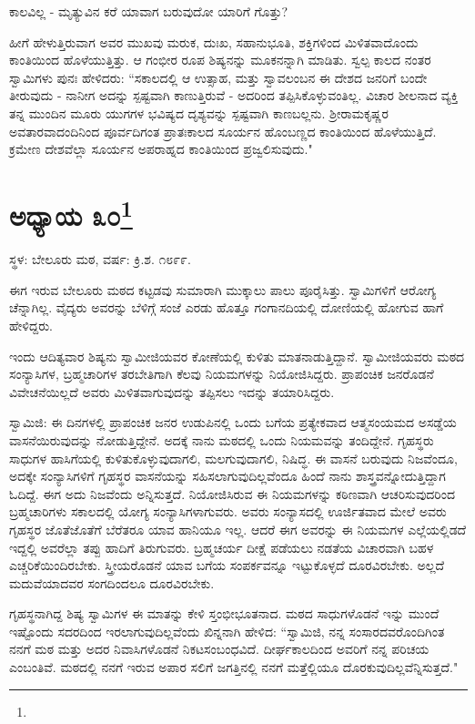 ಕಾಲವಿಲ್ಲ - ಮೃತ್ಯುವಿನ ಕರೆ ಯಾವಾಗ ಬರುವುದೋ ಯಾರಿಗೆ ಗೊತ್ತು?

ಹೀಗೆ ಹೇಳುತ್ತಿರುವಾಗ ಅವರ ಮುಖವು ಮರುಕ, ದುಃಖ, ಸಹಾನುಭೂತಿ, ಶಕ್ತಿಗಳಿಂದ ಮಿಳಿತವಾದೊಂದು ಕಾಂತಿಯಿಂದ ಹೊಳೆಯುತ್ತಿತ್ತು. ಆ ಗಂಭೀರ ರೂಪ ಶಿಷ್ಯನನ್ನು ಮೂಕನನ್ನಾಗಿ ಮಾಡಿತು. ಸ್ವಲ್ಪ ಕಾಲದ ನಂತರ ಸ್ವಾಮಿಗಳು ಪುನಃ ಹೇಳಿದರು: “ಸಕಾಲದಲ್ಲಿ ಆ ಉತ್ಸಾಹ, ಮತ್ತು ಸ್ವಾವಲಂಬನ ಈ ದೇಶದ ಜನರಿಗೆ ಬಂದೇ ತೀರುವುದು - ನಾನೀಗ ಅದನ್ನು ಸ್ಪಷ್ಟವಾಗಿ ಕಾಣುತ್ತಿರುವೆ - ಅದರಿಂದ ತಪ್ಪಿಸಿಕೊಳ್ಳುವಂತಿಲ್ಲ. ವಿಚಾರ ಶೀಲನಾದ ವ್ಯಕ್ತಿ ತನ್ನ ಮುಂದಿನ ಮೂರು ಯುಗಗಳ ಭವಿಷ್ಯದ ದೃಶ್ಯವನ್ನು ಸ್ಪಷ್ಟವಾಗಿ ಕಾಣಬಲ್ಲನು. ಶ‍್ರೀರಾಮಕೃಷ್ಣರ ಅವತಾರವಾದಂದಿನಿಂದ ಪೂರ್ವದಿಗಂತ ಪ್ರಾತಃಕಾಲದ ಸೂರ್ಯನ ಹೊಂಬಣ್ಣದ ಕಾಂತಿಯಿಂದ ಹೊಳೆಯುತ್ತಿದೆ. ಕ್ರಮೇಣ ದೇಶವೆಲ್ಲಾ ಸೂರ್ಯನ ಅಪರಾಹ್ನದ ಕಾಂತಿಯಿಂದ ಪ್ರಜ್ವಲಿಸುವುದು."

\newpage

\chapter[ಅಧ್ಯಾಯ ೩೦]{ಅಧ್ಯಾಯ ೩೦\protect\footnote{}}

\centerline{ಸ್ಥಳ: ಬೇಲೂರು ಮಠ, ವರ್ಷ: ಕ್ರಿ.ಶ. ೧೮೯೯.}

ಈಗ ಇರುವ ಬೇಲೂರು ಮಠದ ಕಟ್ಟಡವು ಸುಮಾರಾಗಿ ಮುಕ್ಕಾಲು ಪಾಲು ಪೂರೈಸಿತ್ತು. ಸ್ವಾಮಿಗಳಿಗೆ ಆರೋಗ್ಯ ಚೆನ್ನಾಗಿಲ್ಲ. ವೈದ್ಯರು ಅವರನ್ನು ಬೆಳಿಗ್ಗೆ ಸಂಜೆ ಎರಡು ಹೊತ್ತೂ ಗಂಗಾನದಿಯಲ್ಲಿ ದೋಣಿಯಲ್ಲಿ ಹೋಗುವ ಹಾಗೆ ಹೇಳಿದ್ದರು.

ಇಂದು ಆದಿತ್ಯವಾರ ಶಿಷ್ಯನು ಸ್ವಾಮೀಜಿಯವರ ಕೋಣೆಯಲ್ಲಿ ಕುಳಿತು ಮಾತನಾಡುತ್ತಿದ್ದಾನೆ. ಸ್ವಾಮೀಜಿಯವರು ಮಠದ ಸಂನ್ಯಾಸಿಗಳ, ಬ್ರಹ್ಮಚಾರಿಗಳ ತರಬೇತಿಗಾಗಿ ಕೆಲವು ನಿಯಮಗಳನ್ನು ನಿಯೋಜಿಸಿದ್ದರು. ಪ್ರಾಪಂಚಿಕ ಜನರೊಡನೆ ವಿವೇಚನೆಯಿಲ್ಲದೆ ಅವರು ಮಿಳಿತವಾಗುವುದನ್ನು ತಪ್ಪಿಸಲು ಇದನ್ನು ತಯಾರಿಸಿದ್ದರು.

ಸ್ವಾಮಿಜಿ: ಈ ದಿನಗಳಲ್ಲಿ ಪ್ರಾಪಂಚಿಕ ಜನರ ಉಡುಪಿನಲ್ಲಿ ಒಂದು ಬಗೆಯ ಪ್ರತ್ಯೇಕವಾದ ಆತ್ಮಸಂಯಮದ ಅಸಡ್ಡೆಯ ವಾಸನೆಯಿರುವುದನ್ನು ನೋಡುತ್ತಿದ್ದೇನೆ. ಅದಕ್ಕೆ ನಾನು ಮಠದಲ್ಲಿ ಒಂದು ನಿಯಮವನ್ನು ತಂದಿದ್ದೇನೆ. ಗೃಹಸ್ಥರು ಸಾಧುಗಳ ಹಾಸಿಗೆಯಲ್ಲಿ ಕುಳಿತುಕೊಳ್ಳುವುದಾಗಲಿ, ಮಲಗುವುದಾಗಲಿ, ನಿಷಿದ್ಧ. ಈ ವಾಸನೆ ಬರುವುದು ನಿಜವೆಂದೂ, ಅದಕ್ಕೇ ಸಂನ್ಯಾಸಿಗಳಿಗೆ ಗೃಹಸ್ಥರ ವಾಸನೆಯನ್ನು ಸಹಿಸಲಾಗುವುದಿಲ್ಲವೆಂದೂ ಹಿಂದೆ ನಾನು ಶಾಸ್ತ್ರವನ್ನೋದುತ್ತಿದ್ದಾಗ ಓದಿದ್ದೆ. ಈಗ ಅದು ನಿಜವೆಂದು ಅನ್ನಿಸುತ್ತದೆ. ನಿಯೋಜಿಸಿರುವ ಈ ನಿಯಮಗಳನ್ನು ಕಠಿಣವಾಗಿ ಆಚರಿಸುವುದರಿಂದ ಬ್ರಹ್ಮಚಾರಿಗಳು ಸಕಾಲದಲ್ಲಿ ಯೋಗ್ಯ ಸಂನ್ಯಾಸಿಗಳಾಗುವರು. ಅವರು ಸಂನ್ಯಾಸದಲ್ಲಿ ಊರ್ಜಿತವಾದ ಮೇಲೆ ಅವರು ಗೃಹಸ್ಥರ ಜೊತೆಜೊತೆಗೆ ಬೆರೆತರೂ ಯಾವ ಹಾನಿಯೂ ಇಲ್ಲ. ಆದರೆ ಈಗ ಅವರನ್ನು ಈ ನಿಯಮಗಳ ಎಲ್ಲೆಯಲ್ಲಿಡದೆ ಇದ್ದಲ್ಲಿ ಅವರೆಲ್ಲಾ ತಪ್ಪು ಹಾದಿಗೆ ತಿರುಗುವರು. ಬ್ರಹ್ಮಚರ್ಯ ದೀಕ್ಷೆ ಪಡೆಯಲು ನಡತೆಯ ವಿಚಾರವಾಗಿ ಬಹಳ ಎಚ್ಚರಿಕೆಯಿಂದಿರಬೇಕು. ಸ್ತ್ರೀಯರೊಡನೆ ಯಾವ ಬಗೆಯ ಸಂಪರ್ಕವನ್ನೂ ಇಟ್ಟುಕೊಳ್ಳದೆ ದೂರವಿರಬೇಕು. ಅಲ್ಲದೆ ಮದುವೆಯಾದವರ ಸಂಗದಿಂದಲೂ ದೂರವಿರಬೇಕು.

ಗೃಹಸ್ಥನಾಗಿದ್ದ ಶಿಷ್ಯ ಸ್ವಾಮಿಗಳ ಈ ಮಾತನ್ನು ಕೇಳಿ ಸ್ತಂಭೀಭೂತನಾದ. ಮಠದ ಸಾಧುಗಳೊಡನೆ ಇನ್ನು ಮುಂದೆ ಇಷ್ಟೊಂದು ಸದರದಿಂದ ಇರಲಾಗುವುದಿಲ್ಲವೆಂದು ಖಿನ್ನನಾಗಿ ಹೇಳಿದ: “ಸ್ವಾಮಿಜಿ, ನನ್ನ ಸಂಸಾರದವರೊಂದಿಗಿಂತ ನನಗೆ ಮಠ ಮತ್ತು ಅದರ ನಿವಾಸಿಗಳೊಡನೆ ನಿಕಟಸಂಬಂಧವಿದೆ. ದೀರ್ಘಕಾಲದಿಂದ ಅವರಿಗೆ ನನ್ನ ಪರಿಚಯ ಎಂಬಂತಿವೆ. ಮಠದಲ್ಲಿ ನನಗೆ ಇರುವ ಅಪಾರ ಸಲಿಗೆ ಜಗತ್ತಿನಲ್ಲಿ ನನಗೆ ಮತ್ತೆಲ್ಲಿಯೂ ದೊರಕುವುದಿಲ್ಲವೆನ್ನಿಸುತ್ತದೆ."

